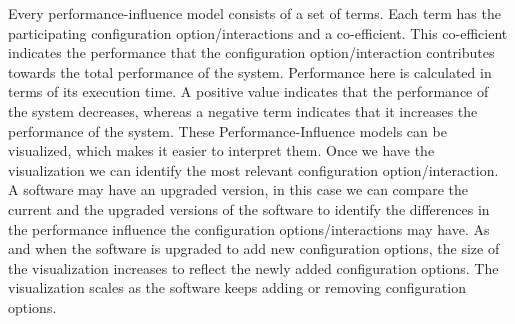 Every performance-influence model consists of a set of terms. Each term has the participating configuration option/interactions and a co-efficient. This co-efficient indicates the performance that the configuration option/interaction contributes towards the total performance of the system.
Performance here is calculated in terms of its execution time. A positive value indicates that the performance of the system decreases, whereas a negative term indicates that it increases the performance of the system.
These Performance-Influence models can be visualized, which makes it easier to interpret them. Once we have the visualization we can identify the most relevant configuration option/interaction.
A software may have an upgraded version, in this case we can compare the current and the upgraded versions of the software to identify the differences in the performance influence the configuration options/interactions may have.
As and when the software is upgraded to add new configuration options, the size of the visualization increases to reflect the newly added configuration options. The visualization scales as the software keeps adding or removing configuration options.
                                                                       

 
 
